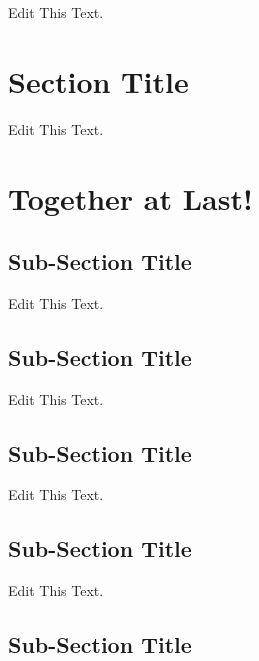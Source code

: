 \documentclass[12pt]{article}
\begin{document}
Edit This Text.

\section{Section Title}

Edit This Text.

\section{Together at Last!}

\subsection{Sub-Section Title}

Edit This Text.

\subsection{Sub-Section Title}

Edit This Text.

\subsection{Sub-Section Title}

Edit This Text.

\subsection{Sub-Section Title}

Edit This Text.

\subsection{Sub-Section Title}
\end{document}
